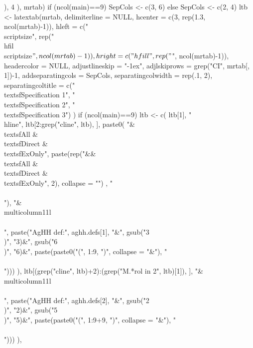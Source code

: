 \begin{Schunk}
\begin{Sinput}
{{             ), 4
          ), 
       mrtab)
    if (ncol(main)==9) SepCols <- c(3, 6) else SepCols <- c(2, 4) 
    ltb <- latextab(mrtab, delimiterline = NULL, 
        hcenter = c(3, rep(1.3, ncol(mrtab)-1)),
        hleft = c("\\scriptsize", rep("\\hfil\\scriptsize$", ncol(mrtab)-1)), 
        hright = c("\\hfill", rep("$", ncol(mrtab)-1)),
        headercolor = NULL, 
        adjustlineskip = "-1ex", adjlskiprows = grep("CI", mrtab[, 1])-1,
        addseparatingcols = SepCols, separatingcolwidth = rep(.1, 2), 
        separatingcoltitle = c("\\textsf{Specification 1}", "\\textsf{Specification 2}", "\\textsf{Specification 3}")
      ) 
  if (ncol(main)==9) 
    ltb <- c(
      ltb[1], 
      "\\hline", 
      ltb[2:grep("cline", ltb), ],
      paste0(
        "&\\textsf{All} & \\textsf{Direct} & \\textsf{ExOnly}",
        paste(rep("&&\\textsf{All} & \\textsf{Direct} & \\textsf{ExOnly}", 2), collapse = "")
        , "\\\\"),
      "&\\multicolumn{11}{l}{}\\\\",
      paste("AgHH def:", aghh.defs[1], "&",
        gsub("3\\)", "3)&", gsub("6\\)", "6)&", paste(paste0("(", 1:9, ")", collapse = "&"), "\\\\")))
        ),
      ltb[(grep("cline", ltb)+2):(grep("M.*rol in 2", ltb)[1]), ], 
      "&\\multicolumn{11}{l}{}\\\\",
      paste("AgHH def:", aghh.defs[2], "&",
        gsub("2\\)", "2)&", gsub("5\\)", "5)&", paste(paste0("(", 1:9+9, ")", collapse = "&"), "\\\\")))
        ),
}}
\end{Sinput}
\end{Schunk}
